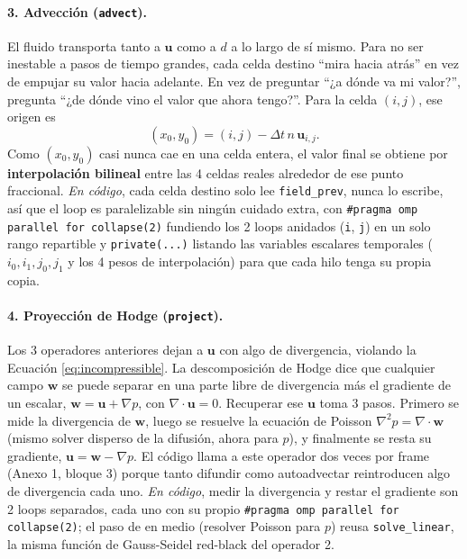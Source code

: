 \documentclass[11pt]{article}
\begin{document}
\paragraph{3. Advección (\texttt{advect}).} El fluido transporta tanto a
$\mathbf{u}$ como a $d$ a lo largo de sí mismo. Para no ser inestable a
pasos de tiempo grandes, cada celda destino ``mira hacia atrás'' en vez
de empujar su valor hacia adelante. En vez de preguntar ``¿a dónde va mi
valor?'', pregunta ``¿de dónde vino el valor que ahora tengo?''. Para la
celda $(i, j)$, ese origen es
\[
(x_0, y_0) = (i, j) - \Delta t \, n \, \mathbf{u}_{i,j}.
\]
Como $(x_0, y_0)$ casi nunca cae en una celda entera, el valor final se
obtiene por \textbf{interpolación bilineal} entre las 4 celdas reales
alrededor de ese punto fraccional. \emph{En código}, cada
celda destino solo lee \texttt{field\_prev}, nunca lo escribe, así que
el loop es paralelizable sin ningún cuidado extra, con
\texttt{\#pragma omp parallel for collapse(2)} fundiendo los 2 loops
anidados (\texttt{i}, \texttt{j}) en un solo rango repartible y
\texttt{private(...)} listando las variables escalares temporales
($i_0, i_1, j_0, j_1$ y los 4 pesos de interpolación) para que cada
hilo tenga su propia copia.

\paragraph{4. Proyección de Hodge (\texttt{project}).} Los 3 operadores
anteriores dejan a $\mathbf{u}$ con algo de divergencia, violando la
Ecuación \ref{eq:incompressible}. La descomposición de Hodge dice que
cualquier campo $\mathbf{w}$ se puede separar en una parte libre de
divergencia más el gradiente de un escalar, $\mathbf{w} = \mathbf{u} +
\nabla p$, con $\nabla \cdot \mathbf{u} = 0$. Recuperar ese $\mathbf{u}$
toma 3 pasos. Primero se mide la divergencia de $\mathbf{w}$, luego se
resuelve la ecuación de Poisson $\nabla^2 p = \nabla \cdot \mathbf{w}$ (mismo solver disperso
de la difusión, ahora para $p$), y finalmente se resta su gradiente,
$\mathbf{u} = \mathbf{w} - \nabla p$. El código llama a este operador dos
veces por frame (Anexo 1, bloque 3) porque tanto difundir como
autoadvectar reintroducen algo de divergencia cada uno. \emph{En
código}, medir la divergencia y restar el gradiente son 2 loops
separados, cada uno con su propio
\texttt{\#pragma omp parallel for collapse(2)}; el paso de en medio
(resolver Poisson para $p$) reusa \texttt{solve\_linear}, la misma
función de Gauss-Seidel red-black del operador 2.
\end{document}
